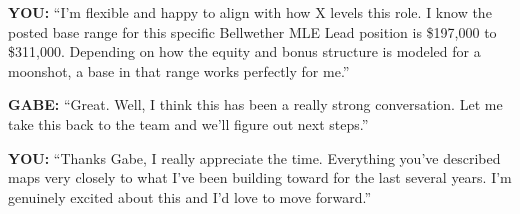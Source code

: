 \documentclass[11pt,letterpaper]{article}
\newenvironment{gabe}{\begin{mdframed}[backgroundcolor=gabebg,linewidth=0pt,innertopmargin=8pt,innerbottommargin=8pt]\textbf{\color{xred}GABE:} }{\end{mdframed}}
\newenvironment{you}{\begin{mdframed}[backgroundcolor=youbg,linewidth=0pt,innertopmargin=8pt,innerbottommargin=8pt]\textbf{\color{xblue}YOU:} }{\end{mdframed}}
\begin{document}
\begin{you}
``I'm flexible and happy to align with how X levels this role. I know the posted base range for this specific Bellwether MLE Lead position is \$197,000 to \$311,000. Depending on how the equity and bonus structure is modeled for a moonshot, a base in that range works perfectly for me.''
\end{you}

\begin{gabe}
``Great. Well, I think this has been a really strong conversation. Let me take this back to the team and we'll figure out next steps.''
\end{gabe}

\begin{you}
``Thanks Gabe, I really appreciate the time. Everything you've described maps very closely to what I've been building toward for the last several years. I'm genuinely excited about this and I'd love to move forward.''
\end{you}
\end{document}
